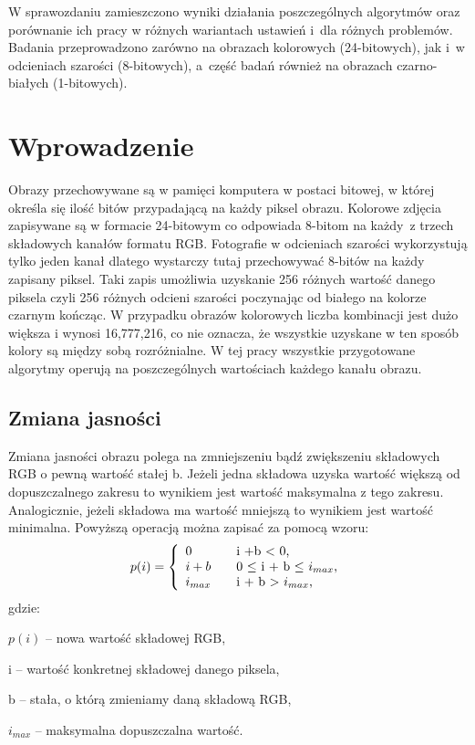 \documentclass{classrep}
\begin{document}
W sprawozdaniu zamieszczono wyniki działania poszczególnych algorytmów oraz porównanie ich pracy w różnych wariantach ustawień i~dla różnych problemów. Badania przeprowadzono zarówno na obrazach kolorowych (24-bitowych), jak i~w odcieniach szarości (8-bitowych), a~część badań również na obrazach czarno-białych (1-bitowych). 

\section{Wprowadzenie}
Obrazy przechowywane są w pamięci komputera w postaci bitowej, w której określa się ilość bitów przypadającą na każdy piksel obrazu. Kolorowe zdjęcia zapisywane są w formacie 24-bitowym co odpowiada 8-bitom na każdy~z trzech składowych kanałów formatu RGB. Fotografie w odcieniach szarości wykorzystują tylko jeden kanał dlatego wystarczy tutaj przechowywać 8-bitów na każdy zapisany piksel. Taki zapis umożliwia uzyskanie 256 różnych wartość danego piksela czyli 256 różnych odcieni szarości poczynając od białego na kolorze czarnym kończąc. W przypadku obrazów kolorowych liczba kombinacji jest dużo większa i wynosi 16,777,216, co nie oznacza, że wszystkie uzyskane w ten sposób kolory są między sobą rozróżnialne. W tej pracy wszystkie przygotowane algorytmy operują na poszczególnych wartościach każdego kanału obrazu.

\subsection{Zmiana jasności}
Zmiana jasności obrazu polega na zmniejszeniu bądź zwiększeniu składowych RGB o pewną wartość stałej b. Jeżeli jedna składowa uzyska wartość większą od dopuszczalnego zakresu to wynikiem jest wartość maksymalna z tego zakresu. Analogicznie, jeżeli składowa ma wartość mniejszą to wynikiem jest wartość minimalna. Powyższą operacją można zapisać za pomocą wzoru:
\begin{equation}
p(i)=\left\{
\begin{array}{l l l}
0 & \quad \mbox{i +b $<$ 0,} \\
i+b & \quad \mbox{0 $\leq$ i + b $\leq$  $i_{max}$,} \\
i_{max} & \quad \mbox{i + b $>$ $i_{max}$,} \\
\end{array}
\right.
\end{equation}
gdzie:
\begin{description}
\item $p(i)$ -- nowa wartość składowej RGB,
\item i -- wartość konkretnej składowej danego piksela,
\item b -- stała, o którą zmieniamy daną składową RGB,
\item $i_{max}$ -- maksymalna dopuszczalna wartość.
\end{description}
\end{document}
